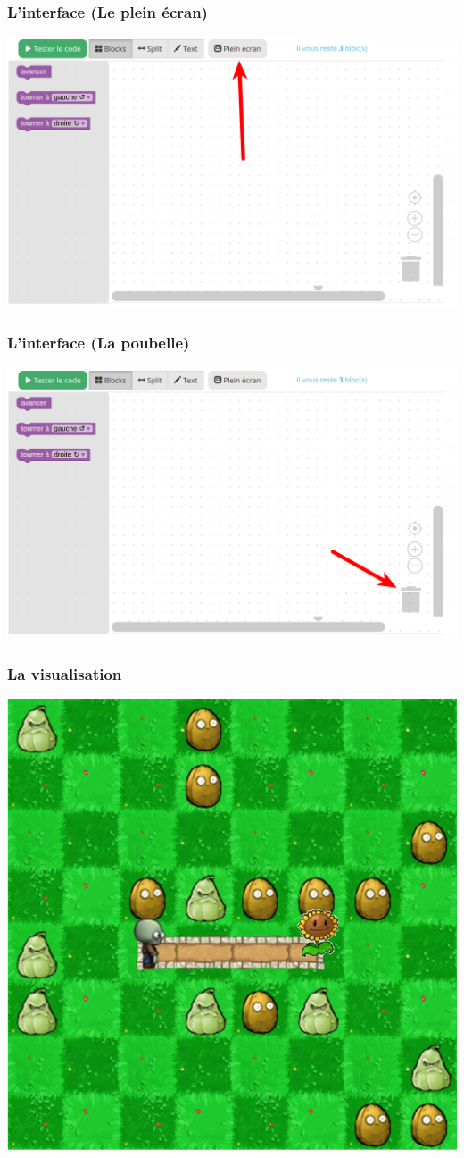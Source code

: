 \documentclass{beamer}
\begin{document}
\begin{frame}
	\frametitle{L'interface (Le plein écran)}

	\includegraphics[width=\linewidth]{interface_fullscreen.png}
\end{frame}

\begin{frame}
	\frametitle{L'interface (La poubelle)}

	\includegraphics[width=\linewidth]{interface_trash.png}
\end{frame}

\begin{frame}
	\frametitle{La visualisation}
	
	\centering
	\includegraphics[width=0.65\linewidth]{visualisation_pvz.png}
\end{frame}
\end{document}
